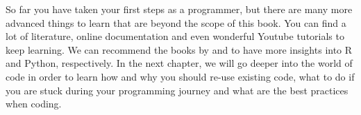 

So far you have taken your first steps as a programmer, but there are many
more advanced things to learn that are beyond the scope of this
book. You can find a lot of literature, online documentation and even
wonderful Youtube tutorials to keep learning. We can recommend the
books by \cite{crawley2012r} and \cite{vanderplas2016python} to have
more insights into R and Python, respectively. In the next chapter, we
will go deeper into the world of code in order to learn how and why
you should re-use existing code, what to do if you are stuck during your
programming journey and what are the best practices when coding.
